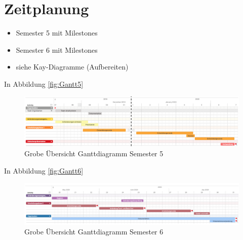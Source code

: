\section{Zeitplanung}\label{ch:zeitplanung}
\begin{itemize}
    \item Semester 5 mit Milestones
    \item Semester 6 mit Milestones
    \item siehe Kay-Diagramme (Aufbereiten)
\end{itemize}

In Abbildung \vref{fig:Gantt5}

\begin{figure}[H]
	\centering 
	\includegraphics[width=\textwidth]{img/GanttSemester5.png}
	\captionsetup{format=hang}
	\caption[Grobe Übersicht Ganttdiagramm Semester 5]{\label{fig:Gantt5}Grobe Übersicht Ganttdiagramm Semester 5}
\end{figure}

In Abbildung \vref{fig:Gantt6}

\begin{figure}[H]
	\centering 
	\includegraphics[width=\textwidth]{img/GanttSemester6.png}
	\captionsetup{format=hang}
	\caption[Grobe Übersicht Ganttdiagramm Semester 6]{\label{fig:Gantt6}Grobe Übersicht Ganttdiagramm Semester 6}
\end{figure}